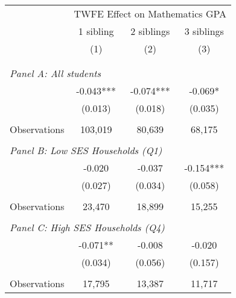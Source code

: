 \makeatletter
{}
{
\makeatother
\begin{tabular}{lccc}
\toprule
\cmidrule(lr){2-4}
& \multicolumn{3}{c}{TWFE Effect on Mathematics GPA} \\
\cmidrule(lr){2-4}
& 1 sibling & 2 siblings & 3 siblings  \\
\cmidrule(lr){2-2} \cmidrule(lr){3-3} \cmidrule(lr){4-4}
& (1) & (2) & (3)\\
\bottomrule
&  &  &  \\
&  &  &   \\
\multicolumn{4}{l}{\textit{Panel A: All students}} \\
\hspace{3mm}        &      -0.043***&      -0.074***&      -0.069*  \\
                    &     (0.013)   &     (0.018)   &     (0.035)   \\
                    &               &               &               \\
\hspace{3mm}Observations&     103,019   &      80,639   &      68,175   \\
 
&  &  &   \\
\multicolumn{4}{l}{\textit{Panel B: Low SES Households (Q1)}} \\
\hspace{3mm}        &      -0.020   &      -0.037   &      -0.154***\\
                    &     (0.027)   &     (0.034)   &     (0.058)   \\
                    &               &               &               \\
\hspace{3mm}Observations&      23,470   &      18,899   &      15,255   \\
 
&  &  &   \\
\multicolumn{4}{l}{\textit{Panel C: High SES Households (Q4)}} \\
\hspace{3mm}        &      -0.071** &      -0.008   &      -0.020   \\
                    &     (0.034)   &     (0.056)   &     (0.157)   \\
                    &               &               &               \\
\hspace{3mm}Observations&      17,795   &      13,387   &      11,717   \\
 

\end{tabular}}
